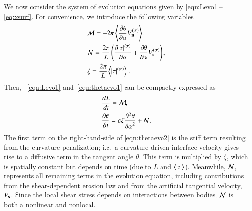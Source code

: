 \documentclass[preprint, 10pt]{elsarticle}
\begin{document}
We now consider the system of evolution equations given by \eqref{eqn:Levo1}--\eqref{eq:xsurf}. For convenience, we introduce the following variables
\begin{align}
& \mathcal{M} = - 2 \pi \left< \frac{\partial \theta}{\partial \alpha} V_{\mathbf{n}}^{(\sigma)} \right>, \\
& \mathcal{N} = \frac{2 \pi}{L} \left( \frac{\partial \lvert \tau \rvert^{(\sigma)}}{\partial \alpha} + \frac{\partial \theta}{\partial \alpha}
V_{\mathbf{s}}^{(\sigma)} \right), \\
& \zeta = \frac{2 \pi}{L}  \left< \lvert \tau \rvert^{(\sigma)} \right> \, .
\end{align}
Then, ~\eqref{eqn:Levo1} and~\eqref{eqn:thetaevo1} can be compactly expressed as
\begin{align}
\label{eqn:Levo2}
& \frac{d L}{d t} = \mathcal{M}, \\
\label{eqn:thetaevo2}
& \frac{\partial \theta}{\partial t} = \varepsilon \zeta \frac{\partial^2 \theta}{{\partial \alpha}^2} + \mathcal{N}.
\end{align}
The first term on the right-hand-side of \eqref{eqn:thetaevo2} is the stiff term resulting from the curvature penalization; i.e.~a curvature-driven interface velocity gives rise to a diffusive term in the tangent angle $\theta$. This term is multiplied by $\zeta$, which is spatially constant but depends on time (due to $L$ and $\left< \lvert \tau \rvert \right>$). Meanwhile, $\mathcal{N}$, represents all remaining terms in the evolution equation, including contributions from the shear-dependent erosion law and from the artificial tangential velocity, $V_{\mathbf{s}}$. Since the local shear stress depends on interactions between bodies, $\mathcal{N}$ is both a nonlinear and nonlocal.
\end{document}
